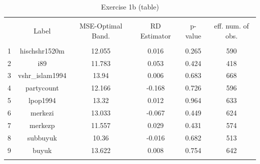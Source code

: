 
\begin{table}[!htbp] \centering 
  \caption{Exercise 1b (table)} 
  \label{} 
\begin{tabular}{@{\extracolsep{5pt}} cccccc} 
\\[-1.8ex]\hline 
\hline \\[-1.8ex] 
 & Label & MSE-Optimal Band. & RD Estimator & p-value & eff. num. of obs. \\ 
\hline \\[-1.8ex] 
1 & hischshr1520m & 12.055 & 0.016 & 0.265 & 590 \\ 
2 & i89 & 11.783 & 0.053 & 0.424 & 418 \\ 
3 & vshr\_islam1994 & 13.94 & 0.006 & 0.683 & 668 \\ 
4 & partycount & 12.166 & -0.168 & 0.726 & 596 \\ 
5 & lpop1994 & 13.32 & 0.012 & 0.964 & 633 \\ 
6 & merkezi & 13.033 & -0.067 & 0.449 & 624 \\ 
7 & merkezp & 11.557 & 0.029 & 0.431 & 574 \\ 
8 & subbuyuk & 10.36 & -0.016 & 0.682 & 513 \\ 
9 & buyuk & 13.622 & 0.008 & 0.754 & 642 \\ 
\hline \\[-1.8ex] 
\end{tabular} 
\end{table} 
